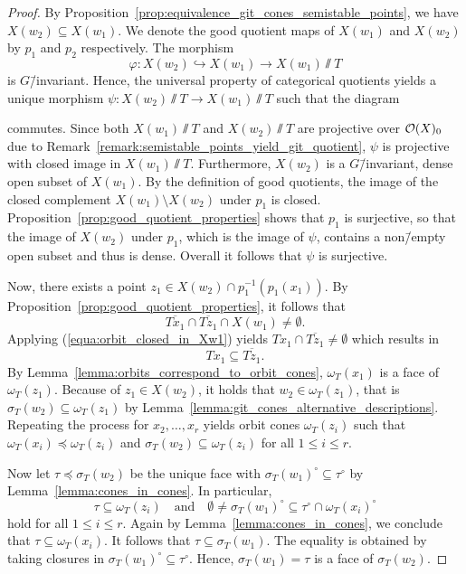 \begin{proof}
	 By Proposition~\ref{prop:equivalence_git_cones_semistable_points}, we have $X(w_2)\subseteq X(w_1)$. We denote the good quotient maps of $X(w_1)$ and $X(w_2)$ by $p_1$ and $p_2$ respectively. The morphism
	 $$\varphi: X(w_2) \hookrightarrow X(w_1) \rightarrow X(w_1) \sslash T$$
	 is $G$\=/invariant. Hence, the universal property of categorical quotients yields a unique morphism $\psi: X(w_2)\sslash T \rightarrow X(w_1)\sslash T$ such that the diagram
	 \begin{center}
	 \end{center}
	 commutes. Since both $X(w_1) \sslash T$ and $X(w_2) \sslash T$ are projective over $\mathcal{O}(X)_0$ due to Remark~\ref{remark:semistable_points_yield_git_quotient}, $\psi$ is projective with closed image in $X(w_1) \sslash T$. Furthermore, $X(w_2)$ is a $G$\=/invariant, dense open subset of $X(w_1)$. By the definition of good quotients, the image of the closed complement $X(w_1)\setminus X(w_2)$ under $p_1$ is closed. Proposition~\ref{prop:good_quotient_properties} shows that $p_1$ is surjective, so that the image of $X(w_2)$ under $p_1$, which is the image of $\psi$, contains a non\=/empty open subset and thus is dense. Overall it follows that $\psi$ is surjective. 
	 
	 Now, there exists a point $z_1\in X(w_2) \cap p_1^{-1}(p_1(x_1))$. By Proposition~\ref{prop:good_quotient_properties}, it follows that 
	 $$\overline{Tx_1} \cap \overline{Tz_1} \cap X(w_1) \neq \emptyset.$$
	 Applying (\ref{equa:orbit_closed_in_Xw1}) yields $Tx_1 \cap \overline{Tz_1} \neq \emptyset$ which results in
	 $$Tx_1 \subseteq \overline{Tz_1}.$$
	 By Lemma~\ref{lemma:orbits_correspond_to_orbit_cones}, $\omega_T(x_1)$ is a face of $\omega_T(z_1)$. Because of $z_1\in X(w_2)$, it holds that $w_2\in \omega_T(z_1)$, that is $\sigma_T(w_2) \subseteq \omega_T(z_1)$ by Lemma~\ref{lemma:git_cones_alternative_descriptions}. Repeating the process for $x_2,\dots,x_r$ yields orbit cones $\omega_T(z_i)$ such that $\omega_T(x_i)\preceq \omega_T(z_i)$ and $\sigma_T(w_2) \subseteq \omega_T(z_i)$ for all $1\leq i\leq r$.
	 
	 Now let $\tau\preceq \sigma_T(w_2)$ be the unique face with $\sigma_T(w_1)^\circ \subseteq \tau^\circ$ by Lemma~\ref{lemma:cones_in_cones}. In particular,
	 $$\tau\subseteq\omega_T(z_i)\quad\mathrm{and}\quad\emptyset \neq \sigma_T(w_1)^\circ \subseteq \tau^\circ \cap \omega_T(x_i)^\circ$$
	 hold for all $1\leq i\leq r$. Again by Lemma~\ref{lemma:cones_in_cones}, we conclude that $\tau\subseteq \omega_T(x_i)$. It follows that $\tau \subseteq \sigma_T(w_1)$. The equality is obtained by taking closures in $\sigma_T(w_1)^\circ \subseteq \tau^\circ$. Hence, $\sigma_T(w_1) = \tau$ is a face of $\sigma_T(w_2)$.
\end{proof}

